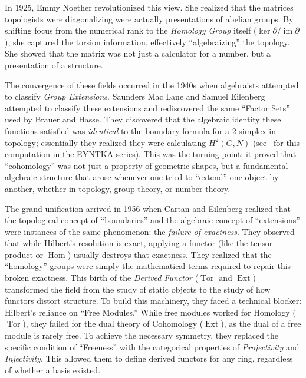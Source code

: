 \documentclass{article}
\begin{document}
In 1925, Emmy Noether revolutionized this view. She realized that the matrices topologists were diagonalizing were actually presentations of abelian groups. By shifting focus from the numerical rank to the \emph{Homology Group} itself ($\ker \partial / \operatorname{im} \partial$), she captured the torsion information, effectively ``algebraizing'' the topology. She showed that the matrix was not just a calculator for a number, but a presentation of a structure.

The convergence of these fields occurred in the 1940s when algebraists attempted to classify \emph{Group
Extensions}. Saunders Mac Lane and Samuel Eilenberg attempted to classify these extensions and rediscovered
the same ``Factor Sets'' used by Brauer and Hasse. They discovered that the algebraic identity these functions
satisfied was \emph{identical} to the boundary formula for a 2-simplex in topology; essentially they realized
they were calculating $H^2(G, N)$ (see~\cite{NateGaloisCohom} for this computation in the EYNTKA series). This was the turning point: it proved that ``cohomology'' was not just a property of geometric shapes, but a fundamental algebraic structure that arose whenever one tried to ``extend'' one object by another, whether in topology, group theory, or number theory.

The grand unification arrived in 1956 when Cartan and Eilenberg realized that the topological concept of ``boundaries'' and the algebraic concept of ``extensions'' were instances of the same phenomenon: the \emph{failure of exactness}. They observed that while Hilbert's resolution is exact, applying a functor (like the tensor product or $\operatorname{Hom}$) usually destroys that exactness. They realized that the ``homology'' groups were simply the mathematical terms required to repair this broken exactness. This birth of the \emph{Derived Functor} ($\operatorname{Tor}$ and $\operatorname{Ext}$) transformed the field from the study of static objects to the study of how functors distort structure. To build this machinery, they faced a technical blocker: Hilbert's reliance on ``Free Modules.'' While free modules worked for Homology ($\operatorname{Tor}$), they failed for the dual theory of Cohomology ($\operatorname{Ext}$), as the dual of a free module is rarely free. To achieve the necessary symmetry, they replaced the specific condition of ``Freeness'' with the categorical properties of \emph{Projectivity} and \emph{Injectivity}. This allowed them to define derived functors for any ring, regardless of whether a basis existed.
\end{document}
